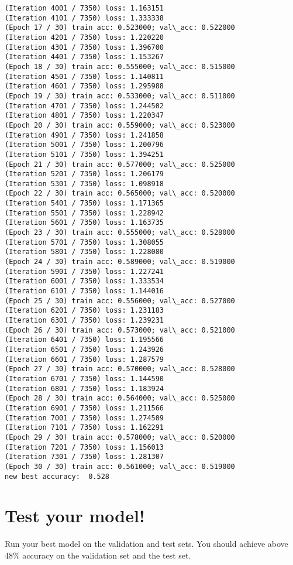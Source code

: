 \documentclass[11pt]{article}
\begin{document}
\begin{Verbatim}[commandchars=\\\{\}]
(Iteration 4001 / 7350) loss: 1.163151
(Iteration 4101 / 7350) loss: 1.333338
(Epoch 17 / 30) train acc: 0.523000; val\_acc: 0.522000
(Iteration 4201 / 7350) loss: 1.220220
(Iteration 4301 / 7350) loss: 1.396700
(Iteration 4401 / 7350) loss: 1.153267
(Epoch 18 / 30) train acc: 0.555000; val\_acc: 0.515000
(Iteration 4501 / 7350) loss: 1.140811
(Iteration 4601 / 7350) loss: 1.295988
(Epoch 19 / 30) train acc: 0.533000; val\_acc: 0.511000
(Iteration 4701 / 7350) loss: 1.244502
(Iteration 4801 / 7350) loss: 1.220347
(Epoch 20 / 30) train acc: 0.559000; val\_acc: 0.523000
(Iteration 4901 / 7350) loss: 1.241858
(Iteration 5001 / 7350) loss: 1.200796
(Iteration 5101 / 7350) loss: 1.394251
(Epoch 21 / 30) train acc: 0.577000; val\_acc: 0.525000
(Iteration 5201 / 7350) loss: 1.206179
(Iteration 5301 / 7350) loss: 1.098918
(Epoch 22 / 30) train acc: 0.565000; val\_acc: 0.520000
(Iteration 5401 / 7350) loss: 1.171365
(Iteration 5501 / 7350) loss: 1.228942
(Iteration 5601 / 7350) loss: 1.163735
(Epoch 23 / 30) train acc: 0.555000; val\_acc: 0.528000
(Iteration 5701 / 7350) loss: 1.308055
(Iteration 5801 / 7350) loss: 1.228080
(Epoch 24 / 30) train acc: 0.589000; val\_acc: 0.519000
(Iteration 5901 / 7350) loss: 1.227241
(Iteration 6001 / 7350) loss: 1.333534
(Iteration 6101 / 7350) loss: 1.144016
(Epoch 25 / 30) train acc: 0.556000; val\_acc: 0.527000
(Iteration 6201 / 7350) loss: 1.231183
(Iteration 6301 / 7350) loss: 1.239231
(Epoch 26 / 30) train acc: 0.573000; val\_acc: 0.521000
(Iteration 6401 / 7350) loss: 1.195566
(Iteration 6501 / 7350) loss: 1.243926
(Iteration 6601 / 7350) loss: 1.287579
(Epoch 27 / 30) train acc: 0.570000; val\_acc: 0.528000
(Iteration 6701 / 7350) loss: 1.144590
(Iteration 6801 / 7350) loss: 1.183924
(Epoch 28 / 30) train acc: 0.564000; val\_acc: 0.525000
(Iteration 6901 / 7350) loss: 1.211566
(Iteration 7001 / 7350) loss: 1.274509
(Iteration 7101 / 7350) loss: 1.162291
(Epoch 29 / 30) train acc: 0.578000; val\_acc: 0.520000
(Iteration 7201 / 7350) loss: 1.156013
(Iteration 7301 / 7350) loss: 1.281307
(Epoch 30 / 30) train acc: 0.561000; val\_acc: 0.519000
new best accuracy:  0.528
    \end{Verbatim}

    \hypertarget{test-your-model}{%
\section{Test your model!}\label{test-your-model}}

Run your best model on the validation and test sets. You should achieve
above 48\% accuracy on the validation set and the test set.
\end{document}
